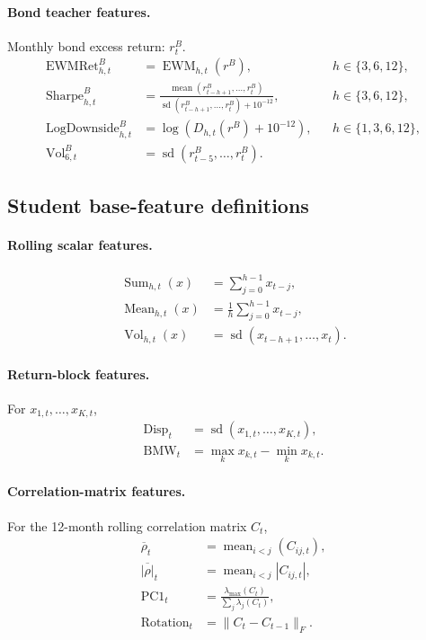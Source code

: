 \paragraph{Bond teacher features.}
Monthly bond excess return: \(r^B_t\).
\begin{align}
\operatorname{EWMRet}^{B}_{h,t}
&=
\operatorname{EWM}_{h,t}(r^B),
&& h\in\{3,6,12\}, \\
\operatorname{Sharpe}^{B}_{h,t}
&=
\frac{
\operatorname{mean}(r^B_{t-h+1},\ldots,r^B_t)
}{
\operatorname{sd}(r^B_{t-h+1},\ldots,r^B_t)+10^{-12}
},
&& h\in\{3,6,12\}, \\
\operatorname{LogDownside}^{B}_{h,t}
&=
\log\!\left(D_{h,t}(r^B)+10^{-12}\right),
&& h\in\{1,3,6,12\}, \\
\operatorname{Vol}^{B}_{6,t}
&=
\operatorname{sd}(r^B_{t-5},\ldots,r^B_t).
\end{align}

\subsection{Student base-feature definitions}
\label{app:student-base-feature-definitions}

\paragraph{Rolling scalar features.}
\begin{align}
\operatorname{Sum}_{h,t}(x)
&=
\sum_{j=0}^{h-1}x_{t-j}, \\
\operatorname{Mean}_{h,t}(x)
&=
\frac{1}{h}\sum_{j=0}^{h-1}x_{t-j}, \\
\operatorname{Vol}_{h,t}(x)
&=
\operatorname{sd}(x_{t-h+1},\ldots,x_t).
\end{align}

\paragraph{Return-block features.}
For \(x_{1,t},\ldots,x_{K,t}\),
\begin{align}
\operatorname{Disp}_{t}
&=
\operatorname{sd}(x_{1,t},\ldots,x_{K,t}), \\
\operatorname{BMW}_{t}
&=
\max_{k}x_{k,t}-\min_{k}x_{k,t}.
\end{align}

\paragraph{Correlation-matrix features.}
For the 12-month rolling correlation matrix \(C_t\),
\begin{align}
\overline{\rho}_{t}
&=
\operatorname{mean}_{i<j}(C_{ij,t}), \\
\overline{|\rho|}_{t}
&=
\operatorname{mean}_{i<j}|C_{ij,t}|, \\
\operatorname{PC1}_{t}
&=
\frac{\lambda_{\max}(C_t)}
{\sum_j\lambda_j(C_t)}, \\
\operatorname{Rotation}_{t}
&=
\|C_t-C_{t-1}\|_F .
\end{align}

